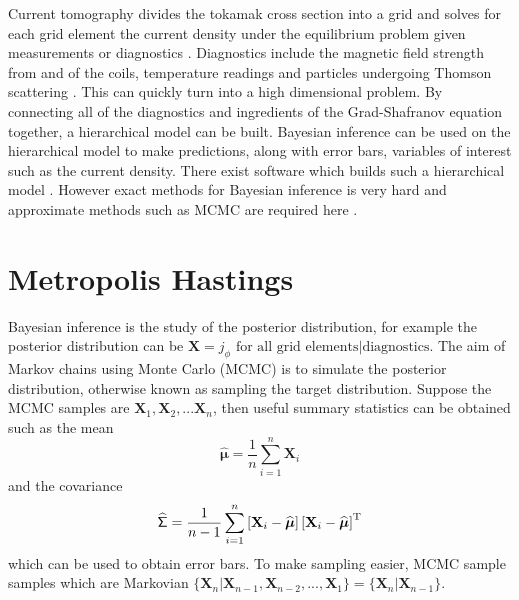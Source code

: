 \documentclass[10pt]{proc}
\newcommand{\T}{^\textup{T}}
\newcommand{\dotdotdot}{...}
\newcommand{\vectGreek}[1]{\boldsymbol{#1}}
\newcommand{\matr}[1]{\mathsf{#1}}
\begin{document}
Current tomography divides the tokamak cross section into a grid and solves for each grid element the current density under the equilibrium problem given measurements or diagnostics \citep{svensson2008current}. Diagnostics include the magnetic field strength from and of the coils, temperature readings and particles undergoing Thomson scattering \citep{svensson2004integrating} \citep{ford2009bayesian}. This can quickly turn into a high dimensional problem. By connecting all of the diagnostics and ingredients of the Grad-Shafranov equation together, a hierarchical model can be built. Bayesian inference can be used on the hierarchical model to make predictions, along with error bars, variables of interest such as the current density. There exist software which builds such a hierarchical model \citep{svensson2007large} \citep{ svensson2008current, svensson2010connecting}. However exact methods for Bayesian inference is  very hard and approximate methods such as MCMC are required here \citep{ford2010tokamak}.

\section{Metropolis Hastings}
Bayesian inference is the study of the posterior distribution, for example the posterior distribution can be $\mathbf{X} = j_\phi\text{ for all grid elements}|\text{diagnostics}$. The aim of Markov chains using Monte Carlo (MCMC) is to simulate the posterior distribution, otherwise known as sampling the target distribution. Suppose the MCMC samples are $\mathbf{X}_1,\mathbf{X}_2,\dotdotdot\mathbf{X}_n$, then useful summary statistics can be obtained such as the mean
\begin{equation}
\widehat{\vectGreek{\mu}} = \dfrac{1}{n}\sum_{i=1}^n \mathbf{X}_i
\end{equation}
and the covariance
\begin{equation}
\widehat{\matr{\Sigma}} = \dfrac{1}{n-1}\sum_{i=1}^n \left[\mathbf{X}_i-\widehat{\vectGreek{\mu}}\right]
\left[\mathbf{X}_i-\widehat{\vectGreek{\mu}}\right]\T
\end{equation}
which can be used to obtain error bars. To make sampling easier, MCMC sample samples which are Markovian $\{\mathbf{X}_n|\mathbf{X}_{n-1},\mathbf{X}_{n-2},\dotdotdot,\mathbf{X}_{1}\} = \{\mathbf{X}_n|\mathbf{X}_{n-1}\}$.
\end{document}
